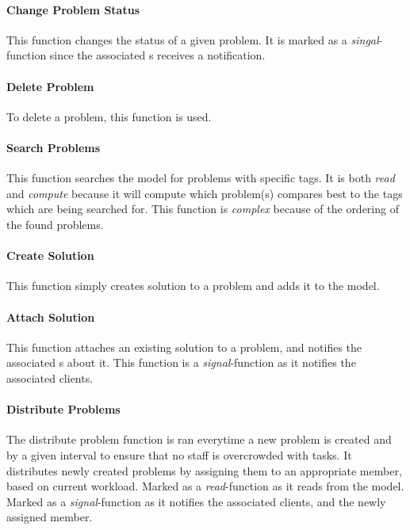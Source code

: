 \paragraph{Change Problem Status} This function changes the status of a given problem. It is marked as a \textit{singal}-function since the associated \client s receives a notification. 

\paragraph{Delete Problem} To delete a problem, this function is used.

\paragraph{Search Problems} 
This function searches the model for problems with specific tags. It is both \textit{read} and \textit{compute} because it will compute which problem(s) compares best to the tags which are being searched for. This function is \textit{complex} because of the ordering of the found problems.

\paragraph{Create Solution} This function simply creates solution to a problem and adds it to the model. 

\paragraph{Attach Solution} This function attaches an existing solution to a problem, and notifies the associated \client s about it. This function is a \textit{signal}-function as it notifies the associated clients. 

\paragraph{Distribute Problems} The distribute problem function is ran everytime a new problem is created and by a given interval to ensure that no staff is overcrowded with tasks. 
It distributes newly created problems by assigning them to an appropriate \astaff[] member, based on current workload. %
Marked as a \textit{read}-function as it reads from the model. Marked as a \textit{signal}-function as it notifies the associated clients, and the newly assigned \astaff[] member. 

